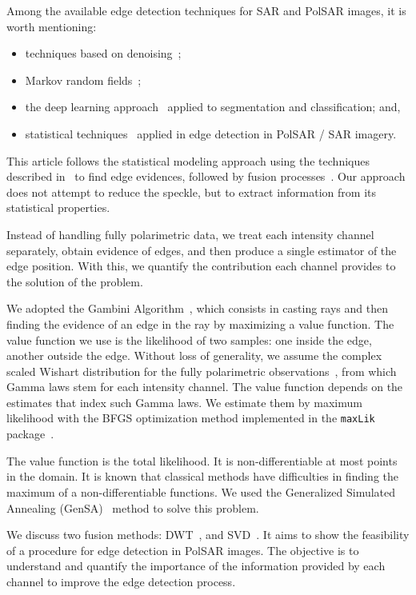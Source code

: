 \documentclass[journal]{IEEEtran}
\begin{document}
Among the available edge detection techniques for SAR and PolSAR images, it is worth mentioning:
\begin{itemize}
\item techniques based on denoising~\cite{sjx, lzly, wxbzw, law, cgaf};   
\item Markov random fields~\cite{bf};	
\item the deep learning approach~\cite{bac, ztmxzxf} applied to segmentation and classification; and,
\item statistical techniques~\cite{gmbf, fbgm, nhfc} applied in edge detection in PolSAR / SAR imagery.
\end{itemize}

This article follows the statistical modeling approach using the techniques described in~\cite{gmbf, fbgm, nhfc} to find edge evidences, followed by fusion processes~\cite{mit, bmf_2019}. 
Our approach does not attempt to reduce the speckle, but to extract information from its statistical properties.

Instead of handling fully polarimetric data, we treat each intensity channel separately, obtain evidence of edges, and then produce a single estimator of the edge position.
With this, we quantify the contribution each channel provides to the solution of the problem.

We adopted the Gambini Algorithm~\cite{gmbf_sc}, which consists in casting rays and then finding the evidence of an edge in the ray by maximizing a value function.
The value function we use is the likelihood of two samples: one inside the edge, another outside the edge.
Without loss of generality, we assume the complex scaled Wishart distribution for the fully polarimetric observations~\cite{ade}, from which Gamma laws stem for each intensity channel.
The value function depends on the estimates that index such Gamma laws.
We estimate them by maximum likelihood with the BFGS optimization method implemented in the \texttt{maxLik} package~\cite{ht}.

The value function is the total likelihood.
It is non-differentiable at most points in the domain. 
It is known that classical methods have difficulties in finding the maximum of a non-differentiable functions. 
We used the Generalized Simulated Annealing (GenSA)~\cite{xgsh} method to solve this problem. 

We discuss two fusion methods: 
DWT~\cite{n_r}, and 
SVD~\cite{naidu}. 
It aims to show the feasibility of a procedure for edge detection in PolSAR images. 
The objective is to understand and quantify the importance of the information provided by each channel to improve the edge detection process.
\end{document}
